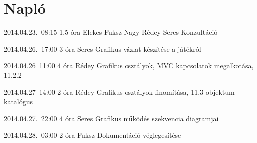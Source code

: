 %
\section{Napló}

\begin{naplo}

\bejegyzes
{2014.04.23.~08:15}
{1,5 óra}
{Elekes
Fuksz
Nagy
Rédey
Seres
}
{Konzultáció}

\bejegyzes
{2014.04.26.~17:00}
{3 óra}
{Seres}
{Grafikus vázlat készítése a játékról}

\bejegyzes
{2014.04.26~11:00}
{4 óra}
{Rédey}
{Grafikus osztályok, MVC kapcsolatok megalkotása, 11.2.2}

\bejegyzes
{2014.04.27~14:00}
{2 óra}
{Rédey}
{Grafikus osztályok finomítása, 11.3 objektum katalógus}

\bejegyzes
{2014.04.27.~22:00}
{4 óra}
{Seres}
{Grafikus működés szekvencia diagramjai}

\bejegyzes
{2014.04.28.~03:00}
{2 óra}
{Fuksz}
{Dokumentáció véglegesítése}


\end{naplo}

